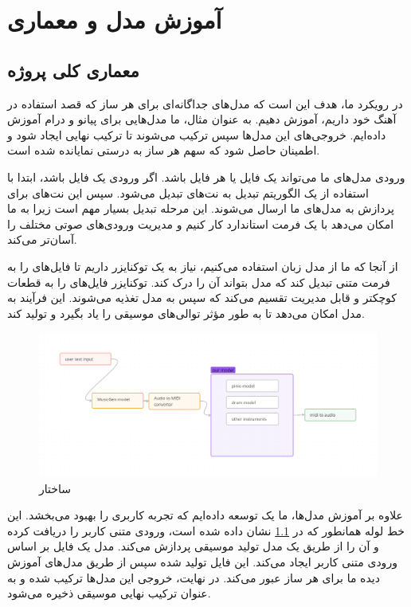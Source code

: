 
\chapter{آموزش مدل و معماری}
\section{معماری کلی پروژه}
در رویکرد ما، هدف این است که مدل‌های جداگانه‌ای برای هر ساز که قصد استفاده در آهنگ خود داریم، آموزش دهیم. به عنوان مثال، ما مدل‌هایی برای پیانو و درام آموزش داده‌ایم. خروجی‌های این مدل‌ها سپس ترکیب می‌شوند تا ترکیب نهایی ایجاد شود و اطمینان حاصل شود که سهم هر ساز به درستی نمایانده شده است.

ورودی مدل‌های ما می‌تواند یک فایل  یا هر فایل  باشد. اگر ورودی یک فایل  باشد، ابتدا با استفاده از یک الگوریتم تبدیل به نت‌های  تبدیل می‌شود. سپس این نت‌های  برای پردازش به مدل‌های ما ارسال می‌شوند. این مرحله تبدیل بسیار مهم است زیرا به ما امکان می‌دهد با یک فرمت استاندارد کار کنیم و مدیریت ورودی‌های صوتی مختلف را آسان‌تر می‌کند.

از آنجا که ما از مدل زبان  استفاده می‌کنیم، نیاز به یک توکنایزر داریم تا فایل‌های  را به فرمت متنی تبدیل کند که مدل بتواند آن را درک کند. توکنایزر فایل‌های  را به قطعات کوچکتر و قابل مدیریت تقسیم می‌کند که سپس به مدل  تغذیه می‌شوند. این فرآیند به مدل امکان می‌دهد تا به طور مؤثر توالی‌های موسیقی را یاد بگیرد و تولید کند.

\begin{figure}[!htb]
      \centering
      \includegraphics[scale=0.3]{Figures/pipe.png}
      \caption{ساختار  
      }
      \label{Fig:Pipe}
\end{figure}


علاوه بر آموزش مدل‌ها، ما یک   توسعه داده‌ایم که تجربه کاربری را بهبود می‌بخشد. این خط لوله همانطور که در \ref{Fig:Pipe} نشان داده شده است، ورودی متنی کاربر را دریافت کرده و آن را از طریق یک مدل تولید موسیقی  \cite{copet2023simple} پردازش می‌کند. مدل  یک فایل  بر اساس ورودی متنی کاربر ایجاد می‌کند. این فایل  تولید شده سپس از طریق مدل‌های آموزش دیده ما برای هر ساز عبور می‌کند. در نهایت، خروجی این مدل‌ها ترکیب شده و به عنوان ترکیب نهایی موسیقی ذخیره می‌شود.

